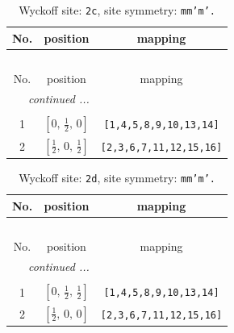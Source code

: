 \documentclass[fleqn,8pt]{jsarticle}
\begin{document}
\renewcommand{\arraystretch}{1.2}
\begin{longtable}{ccc}
\caption{Wyckoff site: {\tt 2c}, site symmetry: {\tt mm'm'.}}
 \\
 \hline \hline
No. & position & mapping \\ \hline \endfirsthead

\multicolumn{2}{l}{\tablename\ \thetable{}} \\
 \hline \hline
No. & position & mapping \\ \hline \endhead

 \hline \hline
\multicolumn{2}{r}{\footnotesize\it continued ...} \\ \endfoot

 \hline \hline
\multicolumn{2}{r}{} \\ \endlastfoot

1 & $\left[ 0,\, \frac{1}{2},\, 0 \right]$ & {\tt [1,4,5,8,9,10,13,14]} \\ \hline
2 & $\left[ \frac{1}{2},\, 0,\, \frac{1}{2} \right]$ & {\tt [2,3,6,7,11,12,15,16]} \\
\end{longtable}
\renewcommand{\arraystretch}{1.2}
\begin{longtable}{ccc}
\caption{Wyckoff site: {\tt 2d}, site symmetry: {\tt mm'm'.}}
 \\
 \hline \hline
No. & position & mapping \\ \hline \endfirsthead

\multicolumn{2}{l}{\tablename\ \thetable{}} \\
 \hline \hline
No. & position & mapping \\ \hline \endhead

 \hline \hline
\multicolumn{2}{r}{\footnotesize\it continued ...} \\ \endfoot

 \hline \hline
\multicolumn{2}{r}{} \\ \endlastfoot

1 & $\left[ 0,\, \frac{1}{2},\, \frac{1}{2} \right]$ & {\tt [1,4,5,8,9,10,13,14]} \\ \hline
2 & $\left[ \frac{1}{2},\, 0,\, 0 \right]$ & {\tt [2,3,6,7,11,12,15,16]} \\
\end{longtable}
\renewcommand{\arraystretch}{1.2}
\end{document}
